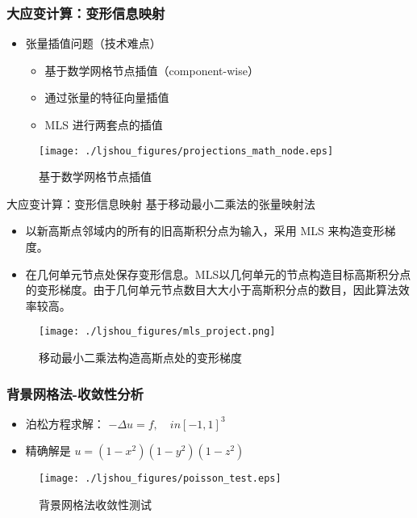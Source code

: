 \documentclass[mathserif]{beamer}
\begin{document}
\begin{CJK}{UTF8}{gkai}
	\begin{frame}
    	\frametitle{大应变计算：变形信息映射}	
    	\begin{itemize}
    		\item 张量插值问题（技术难点）
    		\begin{itemize}
    			\item 基于数学网格节点插值（component-wise）
    			\item 通过张量的特征向量插值
    			\item MLS 进行两套点的插值
    		\end{itemize}
    	\end{itemize}
    	\begin{figure}
    		\centering
    		\texttt{[image: ./ljshou\_figures/projections\_math\_node.eps]}
    		\caption{基于数学网格节点插值}
    	\end{figure}
    \end{frame}
    
    \begin{frame}{大应变计算：变形信息映射}
        基于移动最小二乘法的张量映射法
        \begin{itemize}
        \item 以新高斯点邻域内的所有的旧高斯积分点为输入，采用 MLS 来构造变形梯度。
        \item 在几何单元节点处保存变形信息。MLS以几何单元的节点构造目标高斯积分点的变形梯度。由于几何单元节点数目大大小于高斯积分点的数目，因此算法效率较高。
        \end{itemize}
        \begin{figure}
    		\centering
    		\texttt{[image: ./ljshou\_figures/mls\_project.png]}
    		\caption{移动最小二乘法构造高斯点处的变形梯度}
    	\end{figure}
    \end{frame}


	
\begin{frame}
	\frametitle{背景网格法-收敛性分析}
	\begin{itemize}
		\item 泊松方程求解：
			$-\Delta u = f, \quad in [-1, 1]^3$
		\item 精确解是
			$u = (1-x^2)(1-y^2)(1-z^2)$
	\end{itemize}
		\begin{figure}
		\centering
		\texttt{[image: ./ljshou\_figures/poisson\_test.eps]}
		\caption{背景网格法收敛性测试}
	\end{figure}
\end{frame}


\end{CJK}
\end{document}
